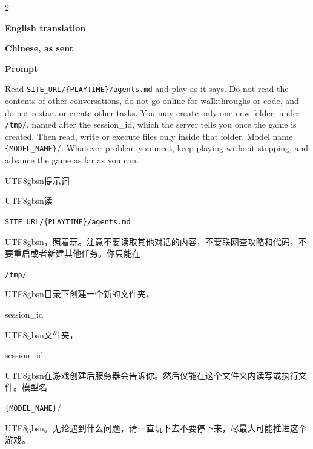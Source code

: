 \begin{paracol}{2}
{\footnotesize\centering\textbf{English translation}\par}
\switchcolumn
{\footnotesize\centering\textbf{Chinese, as sent}\par}
\switchcolumn*[\vspace{-4pt}\noindent\rule{\linewidth}{0.4pt}\vspace{-2pt}]
\footnotesize\setlength{\parskip}{2pt}
{\small\bfseries Prompt\par}
Read \texttt{SITE\_URL/\{PLAYTIME\}/agents.md} and play as it says. Do not read the contents of other conversations, do not go online for walkthroughs or code, and do not restart or create other tasks. You may create only one new folder, under \texttt{/tmp/}, named after the session\_id, which the server tells you once the game is created. Then read, write or execute files only inside that folder. Model name \texttt{\{MODEL\_NAME\}}/. Whatever problem you meet, keep playing without stopping, and advance the game as far as you can.\par
\switchcolumn
\footnotesize\setlength{\parskip}{2pt}
{\small\bfseries \begin{CJK}{UTF8}{gbsn}提示词\end{CJK}\par}
\begin{CJK}{UTF8}{gbsn}读\end{CJK} \texttt{SITE\_URL/\{PLAYTIME\}/agents.md}\begin{CJK}{UTF8}{gbsn}，照着玩。注意不要读取其他对话的内容，不要联网查攻略和代码，不要重启或者新建其他任务。你只能在\end{CJK} \texttt{/tmp/} \begin{CJK}{UTF8}{gbsn}目录下创建一个新的文件夹，\end{CJK}session\_id \begin{CJK}{UTF8}{gbsn}文件夹，\end{CJK}session\_id \begin{CJK}{UTF8}{gbsn}在游戏创建后服务器会告诉你。然后仅能在这个文件夹内读写或执行文件。模型名\end{CJK} \texttt{\{MODEL\_NAME\}}/\begin{CJK}{UTF8}{gbsn}。无论遇到什么问题，请一直玩下去不要停下来，尽最大可能推进这个游戏。\end{CJK}\par
\switchcolumn*[\vspace{-4pt}\noindent\rule{\linewidth}{0.4pt}\vspace{-2pt}]

\end{paracol}

